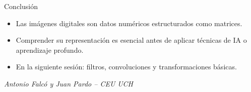 \documentclass[10pt]{beamer}
\begin{document}
\begin{frame}{Conclusi\'on}
\begin{itemize}
  \item Las im\'agenes digitales son datos num\'ericos estructurados como matrices.
  \item Comprender su representaci\'on es esencial antes de aplicar t\'ecnicas de IA o aprendizaje profundo.
  \item En la siguiente sesi\'on: filtros, convoluciones y transformaciones b\'asicas.
\end{itemize}
\vfill
\centering\textit{\small Antonio Falc\'o y Juan Pardo -- CEU UCH}
\end{frame}
\end{document}
